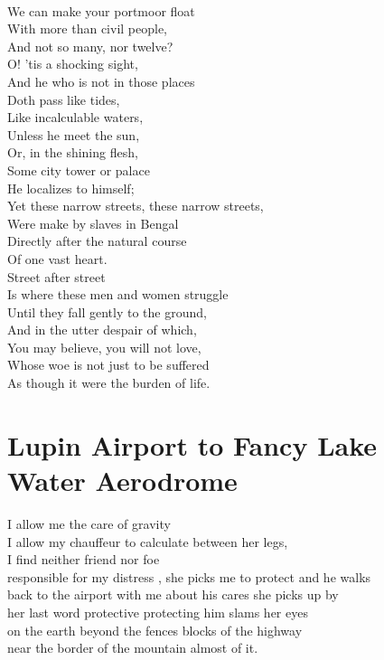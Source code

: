 \documentclass[smalldemyvopaper,11pt,twoside,onecolumn,openright,extrafontsizes]{memoir}
\begin{document}
\\We can make your portmoor float
\\With more than civil people,
\\And not so many, nor twelve?
\\O! 'tis a shocking sight,
\\And he who is not in those places
\\Doth pass like tides,
\\Like incalculable waters,
\\Unless he meet the sun,
\\Or, in the shining flesh,
\\Some city tower or palace
\\He localizes to himself;
\\Yet these narrow streets, these narrow streets,
\\Were make by slaves in Bengal
\\Directly after the natural course
\\Of one vast heart.
\\Street after street
\\Is where these men and women struggle
\\Until they fall gently to the ground,
\\And in the utter despair of which,
\\You may believe, you will not love,
\\Whose woe is not just to be suffered
\\As though it were the burden of life.



\chapter{Lupin Airport to Fancy Lake Water Aerodrome}
I allow  me the care of gravity
\\I allow  my chauffeur  to calculate  between  her legs,
\\I find  neither friend nor foe
\\responsible for my  distress ,  she  picks  me  to  protect  and  he  walks
\\back to  the  airport  with  me  about  his   cares  she  picks up   by
\\her  last  word  protective  protecting  him   slams  her eyes
\\on  the  earth    beyond   the    fences    blocks  of   the  highway
\\near    the   border   of   the   mountain    almost    of  it.
\end{document}
